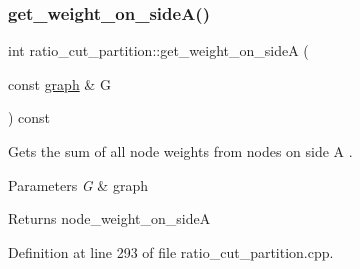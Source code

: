 \subsubsection{\texorpdfstring{get\+\_\+weight\+\_\+on\+\_\+side\+A()}{get\_weight\_on\_sideA()}}
{\footnotesize\ttfamily int ratio\+\_\+cut\+\_\+partition\+::get\+\_\+weight\+\_\+on\+\_\+sideA (\begin{DoxyParamCaption}\item[{const \mbox{\hyperlink{classgraph}{graph}} \&}]{G }\end{DoxyParamCaption}) const}

Gets the sum of all node weights from nodes on side {\ttfamily A }.


\begin{DoxyParams}{Parameters}
{\em G} & graph \\
\hline
\end{DoxyParams}
\begin{DoxyReturn}{Returns}
{\ttfamily node\+\_\+weight\+\_\+on\+\_\+sideA} 
\end{DoxyReturn}


Definition at line 293 of file ratio\+\_\+cut\+\_\+partition.\+cpp.



